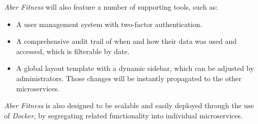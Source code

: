 \par
\textit{Aber Fitness} will also feature a number of supporting tools, such as:

\begin{itemize}
	\item A user management system with two-factor authentication.
	\item A comprehensive audit trail of when and how their data was used and accessed, which is filterable by date.
	\item A global layout template with a dynamic sidebar, which can be adjusted by administrators. Those changes will be instantly propagated to the other microservices.
\end{itemize}

\par
\textit{Aber Fitness} is also designed to be scalable and easily deployed through the use of \textit{Docker}, by segregating related functionality into individual microservices.
